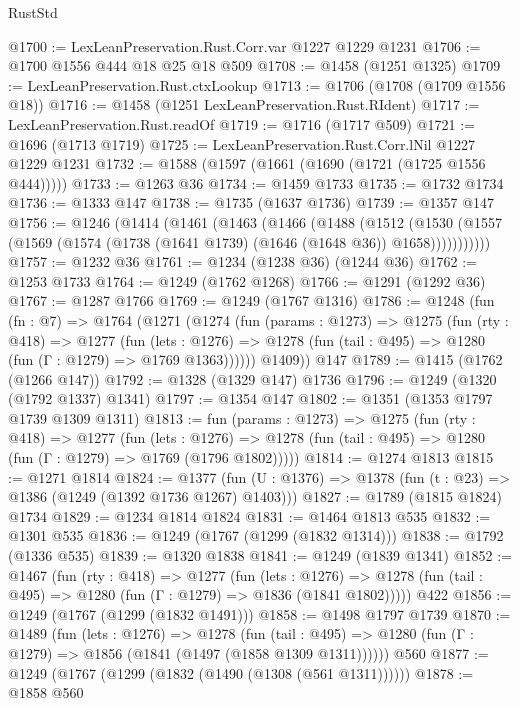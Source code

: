 \begin{lexlean}{RustStd}
\begin{coremodule}
@1700 := LexLeanPreservation.Rust.Corr.var @1227 @1229 @1231
@1706 := @1700 @1556 @444 @18 @25 @18 @509
@1708 := @1458 (@1251 @1325)
@1709 := LexLeanPreservation.Rust.ctxLookup
@1713 := @1706 (@1708 (@1709 @1556 @18))
@1716 := @1458 (@1251 LexLeanPreservation.Rust.RIdent)
@1717 := LexLeanPreservation.Rust.readOf
@1719 := @1716 (@1717 @509)
@1721 := @1696 (@1713 @1719)
@1725 := LexLeanPreservation.Rust.Corr.lNil @1227 @1229 @1231
@1732 := @1588 (@1597 (@1661 (@1690 (@1721 (@1725 @1556 @444)))))
@1733 := @1263 @36
@1734 := @1459 @1733
@1735 := @1732 @1734
@1736 := @1333 @147
@1738 := @1735 (@1637 @1736)
@1739 := @1357 @147
@1756 := @1246
    (@1414
      (@1461
        (@1463
          (@1466
            (@1488
              (@1512
                (@1530
                  (@1557 (@1569 (@1574 (@1738 (@1641 @1739) (@1646 (@1648 @36)) @1658)))))))))))
@1757 := @1232 @36
@1761 := @1234 (@1238 @36) (@1244 @36)
@1762 := @1253 @1733
@1764 := @1249 (@1762 @1268)
@1766 := @1291 (@1292 @36)
@1767 := @1287 @1766
@1769 := @1249 (@1767 @1316)
@1786 := @1248
    (fun (fn : @7) =>
    @1764
      (@1271
        (@1274
          (fun (params : @1273) =>
          @1275
            (fun (rty : @418) =>
            @1277
              (fun (lets : @1276) =>
              @1278 (fun (tail : @495) => @1280 (fun (Γ : @1279) => @1769 @1363))))))
        @1409))
    @147
@1789 := @1415 (@1762 (@1266 @147))
@1792 := @1328 (@1329 @147) @1736
@1796 := @1249 (@1320 (@1792 @1337) @1341)
@1797 := @1354 @147
@1802 := @1351 (@1353 @1797 @1739 @1309 @1311)
@1813 := fun (params : @1273) =>
  @1275
    (fun (rty : @418) =>
    @1277
      (fun (lets : @1276) =>
      @1278 (fun (tail : @495) => @1280 (fun (Γ : @1279) => @1769 (@1796 @1802)))))
@1814 := @1274 @1813
@1815 := @1271 @1814
@1824 := @1377 (fun (U : @1376) => @1378 (fun (t : @23) => @1386 (@1249 (@1392 @1736 @1267) @1403)))
@1827 := @1789 (@1815 @1824) @1734
@1829 := @1234 @1814 @1824
@1831 := @1464 @1813 @535
@1832 := @1301 @535
@1836 := @1249 (@1767 (@1299 (@1832 @1314)))
@1838 := @1792 (@1336 @535)
@1839 := @1320 @1838
@1841 := @1249 (@1839 @1341)
@1852 := @1467
    (fun (rty : @418) =>
    @1277
      (fun (lets : @1276) =>
      @1278 (fun (tail : @495) => @1280 (fun (Γ : @1279) => @1836 (@1841 @1802)))))
    @422
@1856 := @1249 (@1767 (@1299 (@1832 @1491)))
@1858 := @1498 @1797 @1739
@1870 := @1489
    (fun (lets : @1276) =>
    @1278
      (fun (tail : @495) => @1280 (fun (Γ : @1279) => @1856 (@1841 (@1497 (@1858 @1309 @1311))))))
    @560
@1877 := @1249 (@1767 (@1299 (@1832 (@1490 (@1308 (@561 @1311))))))
@1878 := @1858 @560

\end{coremodule}
\end{lexlean}
